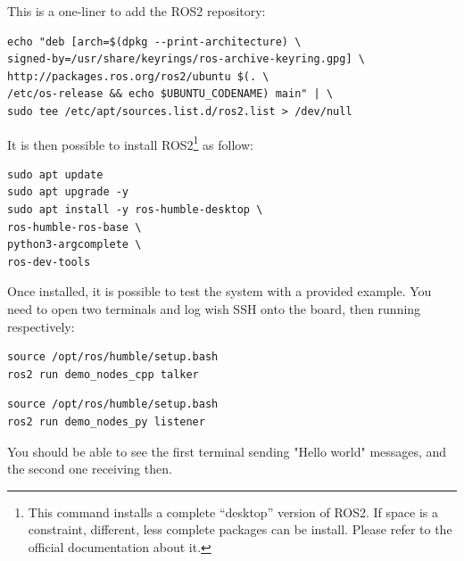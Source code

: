 \documentclass[10pt]{article}
\begin{document}
This is a one-liner to add the ROS2 repository:

\begin{tcolorbox}
\begin{verbatim}
echo "deb [arch=$(dpkg --print-architecture) \
signed-by=/usr/share/keyrings/ros-archive-keyring.gpg] \
http://packages.ros.org/ros2/ubuntu $(. \
/etc/os-release && echo $UBUNTU_CODENAME) main" | \
sudo tee /etc/apt/sources.list.d/ros2.list > /dev/null

\end{verbatim}
\end{tcolorbox}

It is then possible to install ROS2\footnote{This command installs a complete ``desktop'' version of ROS2. If space is a constraint, different, less complete packages can be install. Please refer to the official documentation about it.} as follow:

\begin{tcolorbox}
\begin{verbatim}
sudo apt update
sudo apt upgrade -y
sudo apt install -y ros-humble-desktop \
ros-humble-ros-base \
python3-argcomplete \
ros-dev-tools

\end{verbatim}
\end{tcolorbox}

Once installed, it is possible to test the system with a provided example.
You need to open two terminals and log wish SSH onto the board, then running
respectively:

\begin{tcolorbox}
\begin{verbatim}
source /opt/ros/humble/setup.bash
ros2 run demo_nodes_cpp talker

\end{verbatim}
\end{tcolorbox}



\begin{tcolorbox}
\begin{verbatim}
source /opt/ros/humble/setup.bash
ros2 run demo_nodes_py listener

\end{verbatim}
\end{tcolorbox}


You should be able to see the first terminal sending "Hello world" messages,
and the second one receiving then.


\end{document}

